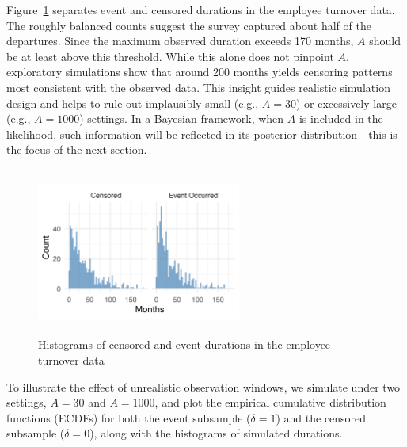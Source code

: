 Figure~\ref{fig:离职数据分开的直方图} separates event and censored durations in the employee turnover data. The roughly balanced counts suggest the survey captured about half of the departures. Since the maximum observed duration exceeds 170 months, $A$ should be at least above this threshold. While this alone does not pinpoint $A$, exploratory simulations show that around 200 months yields censoring patterns most consistent with the observed data. This insight guides realistic simulation design and helps to rule out implausibly small (e.g., $A=30$) or excessively large (e.g., $A=1000$) settings. In a Bayesian framework, when $A$ is included in the likelihood, such information will be reflected in its posterior distribution—this is the focus of the next section.
\begin{figure}[H]
    \centering
    \includegraphics[height=5.5cm, width=0.6\textwidth]{images/separate_hist.png}
    \caption{{\small Histograms of censored and event durations in the employee turnover data}}
    \label{fig:离职数据分开的直方图}
\end{figure}
To illustrate the effect of unrealistic observation windows, we simulate under two settings, $A = 30$ and $A = 1000$, and plot the empirical cumulative distribution functions (ECDFs) for both the event subsample ($\delta = 1$) and the censored subsample ($\delta = 0$), along with the histograms of simulated durations.
